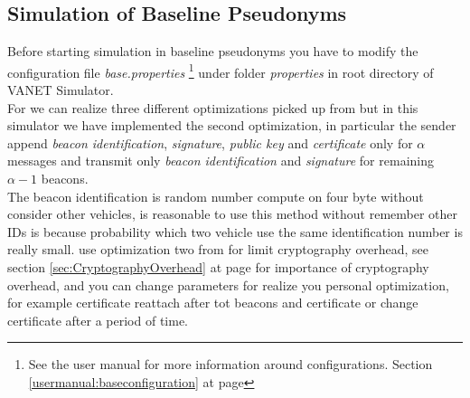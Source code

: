 \subsection{Simulation of Baseline Pseudonyms}
Before starting simulation in baseline pseudonyms you have to modify the configuration file \textit{base.properties} \footnote{See the user manual for more information around configurations. Section \ref{usermanual:baseconfiguration} at page \pageref{usermanual:baseconfiguration}} under folder \textit{properties} in root directory of VANET Simulator.\\
For \baseline we can realize three different optimizations picked up from \cite{calandriello} but in this simulator we have implemented the second optimization, in particular the sender append \textit{beacon identification}, \textit{signature}, \textit{public key} and \textit{certificate} only for $\alpha$ messages and transmit only \textit{beacon identification} and \textit{signature} for remaining $\alpha-1$ beacons. \\
The beacon identification is random number compute on four byte without consider other vehicles, is reasonable to use this method without remember other IDs is because probability which two vehicle use the same identification number is really small.
\baseline use optimization two from \cite{calandriello} for limit cryptography overhead, see section \ref{sec:CryptographyOverhead} at page \pageref{sec:CryptographyOverhead} for importance of cryptography overhead, and you can change parameters for realize you personal optimization, for example certificate reattach after tot beacons and certificate or change certificate after a period of time.
